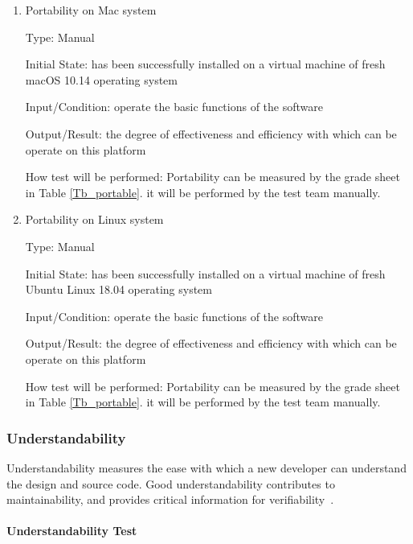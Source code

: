 \documentclass[12pt, titlepage]{article}
\begin{document}
\begin{enumerate}
\item{Portability on Mac system}

Type: Manual
					
Initial State: \progname{} has been successfully installed on a virtual machine of fresh macOS 10.14 operating system
					
Input/Condition: operate the basic functions of the software
					
Output/Result: the degree of effectiveness and efficiency
with which \progname{} can be operate on this platform
					
How test will be performed: Portability can be measured by the grade sheet in Table \ref{Tb_portable}. it  will  be  performed  by  the  test  team manually.

\item{Portability on Linux system}

Type: Manual
					
Initial State: \progname{} has been successfully installed on a virtual machine of fresh Ubuntu Linux 18.04 operating system
					
Input/Condition: operate the basic functions of the software
					
Output/Result: the degree of effectiveness and efficiency
with which \progname{} can be operate on this platform
					
How test will be performed: Portability can be measured by the grade sheet in Table \ref{Tb_portable}. it  will  be  performed  by  the  test  team manually.
\end{enumerate}

\subsubsection{Understandability}
\label{sec_understandtest}

Understandability measures the ease
with which a new developer can understand the design and source code. Good understandability
contributes to maintainability, and provides critical information for verifiability~\cite{SmithEtAl2018}.

\paragraph{Understandability Test}
\end{document}
